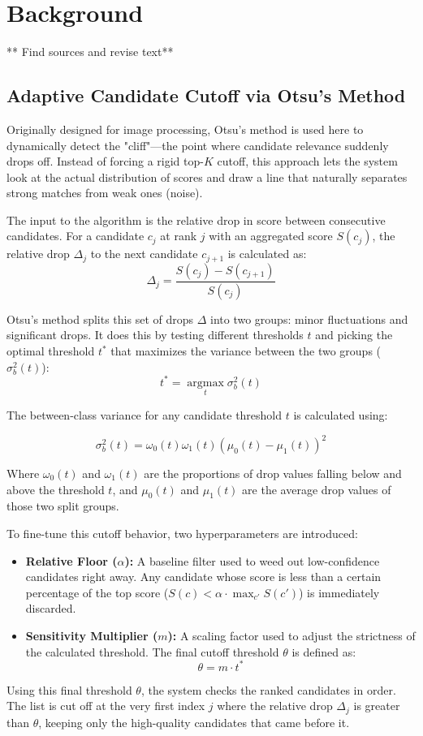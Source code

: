 \section{Background}
\label{sec:grundlagen}

** Find sources and revise text**
\subsection{Adaptive Candidate Cutoff via Otsu's Method}
\label{subsec:otsu_cutoff}
Originally designed for image processing, Otsu's method is used here to dynamically detect the "cliff"—the point where candidate relevance suddenly drops off. Instead of forcing a rigid top-$K$ cutoff, this approach lets the system look at the actual distribution of scores and draw a line that naturally separates strong matches from weak ones (noise).

The input to the algorithm is the relative drop in score between consecutive candidates. For a candidate $c_j$ at rank $j$ with an aggregated score $S(c_j)$, the relative drop $\Delta_j$ to the next candidate $c_{j+1}$ is calculated as:
$$\Delta_j = \frac{S(c_j) - S(c_{j+1})}{S(c_j)}$$

Otsu's method splits this set of drops $\Delta$ into two groups: minor fluctuations and significant drops. It does this by testing different thresholds $t$ and picking the optimal threshold $t^*$ that maximizes the variance between the two groups ($\sigma_b^2(t)$):
$$t^* = \operatorname*{argmax}_{t} \sigma^2_b(t)$$

The between-class variance for any candidate threshold $t$ is calculated using:

$$\sigma_b^2(t) = \omega_0(t) \omega_1(t) (\mu_0(t) - \mu_1(t))^2$$

Where $\omega_0(t)$ and $\omega_1(t)$ are the proportions of drop values falling below and above the threshold $t$, and $\mu_0(t)$ and $\mu_1(t)$ are the average drop values of those two split groups.

To fine-tune this cutoff behavior, two hyperparameters are introduced:
\begin{itemize}
    \item \textbf{Relative Floor ($\alpha$):} A baseline filter used to weed out low-confidence candidates right away. Any candidate whose score is less than a certain percentage of the top score ($S(c) < \alpha \cdot \max_{c'} S(c')$) is immediately discarded.
    \item \textbf{Sensitivity Multiplier ($m$):} A scaling factor used to adjust the strictness of the calculated threshold. The final cutoff threshold $\theta$ is defined as:
    $$\theta = m \cdot t^*$$
\end{itemize}

Using this final threshold $\theta$, the system checks the ranked candidates in order. The list is cut off at the very first index $j$ where the relative drop $\Delta_j$ is greater than $\theta$, keeping only the high-quality candidates that came before it.

